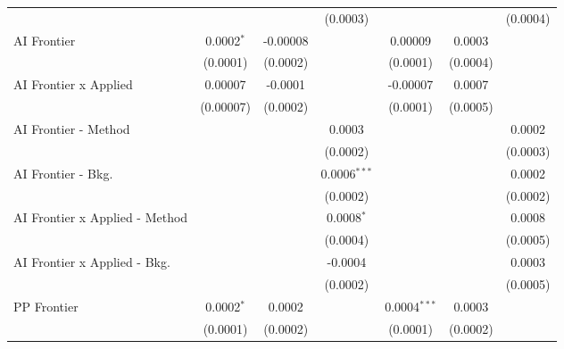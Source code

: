 \begin{tabular}{lcccccc}
                                  &                 &                 & (0.0003)        &                 &                & (0.0004)\\   
   AI Frontier                    & 0.0002$^{*}$    & -0.00008        &                 & 0.00009         & 0.0003         &   \\   
                                  & (0.0001)        & (0.0002)        &                 & (0.0001)        & (0.0004)       &   \\   
   AI Frontier x Applied          & 0.00007         & -0.0001         &                 & -0.00007        & 0.0007         &   \\   
                                  & (0.00007)       & (0.0002)        &                 & (0.0001)        & (0.0005)       &   \\   
   AI Frontier - Method           &                 &                 & 0.0003          &                 &                & 0.0002\\   
                                  &                 &                 & (0.0002)        &                 &                & (0.0003)\\   
   AI Frontier - Bkg.             &                 &                 & 0.0006$^{***}$  &                 &                & 0.0002\\   
                                  &                 &                 & (0.0002)        &                 &                & (0.0002)\\   
   AI Frontier x Applied - Method &                 &                 & 0.0008$^{*}$    &                 &                & 0.0008\\   
                                  &                 &                 & (0.0004)        &                 &                & (0.0005)\\   
   AI Frontier x Applied - Bkg.   &                 &                 & -0.0004         &                 &                & 0.0003\\   
                                  &                 &                 & (0.0002)        &                 &                & (0.0005)\\   
   PP Frontier                    & 0.0002$^{*}$    & 0.0002          &                 & 0.0004$^{***}$  & 0.0003         &   \\   
                                  & (0.0001)        & (0.0002)        &                 & (0.0001)        & (0.0002)       &   \\   

\end{tabular}
